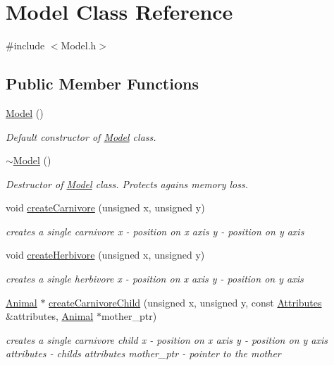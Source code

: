 \hypertarget{class_model}{}\section{Model Class Reference}
\label{class_model}


{\ttfamily \#include $<$Model.\+h$>$}

\subsection*{Public Member Functions}
\begin{DoxyCompactItemize}
\item 
\hyperlink{class_model_ae3b375de5f6df4faf74a95d64748e048}{Model} ()
\begin{DoxyCompactList}\small\item\em Default constructor of \hyperlink{class_model}{Model} class. \end{DoxyCompactList}\item 
\hyperlink{class_model_ad6ebd2062a0b823db841a0b88baac4c0}{$\sim$\+Model} ()
\begin{DoxyCompactList}\small\item\em Destructor of \hyperlink{class_model}{Model} class. Protects agains memory loss. \end{DoxyCompactList}\item 
void \hyperlink{class_model_aa6ac184b9cbcceddbe5a44c97cfdd618}{create\+Carnivore} (unsigned x, unsigned y)
\begin{DoxyCompactList}\small\item\em creates a single carnivore  x -\/ position on x axis  y -\/ position on y axis \end{DoxyCompactList}\item 
void \hyperlink{class_model_a26eee2f12fc902ea98e53001c0d1c4ea}{create\+Herbivore} (unsigned x, unsigned y)
\begin{DoxyCompactList}\small\item\em creates a single herbivore  x -\/ position on x axis  y -\/ position on y axis \end{DoxyCompactList}\item 
\hyperlink{class_animal}{Animal} $\ast$ \hyperlink{class_model_a8b359acfc61eb24f4b005a8782970616}{create\+Carnivore\+Child} (unsigned x, unsigned y, const \hyperlink{class_attributes}{Attributes} \&attributes, \hyperlink{class_animal}{Animal} $\ast$mother\+\_\+ptr)
\begin{DoxyCompactList}\small\item\em creates a single carnivore child  x -\/ position on x axis  y -\/ position on y axis  attributes -\/ child\textquotesingle{}s attributes  mother\+\_\+ptr -\/ pointer to the mother \end{DoxyCompactList}\item 

\end{DoxyCompactItemize}
